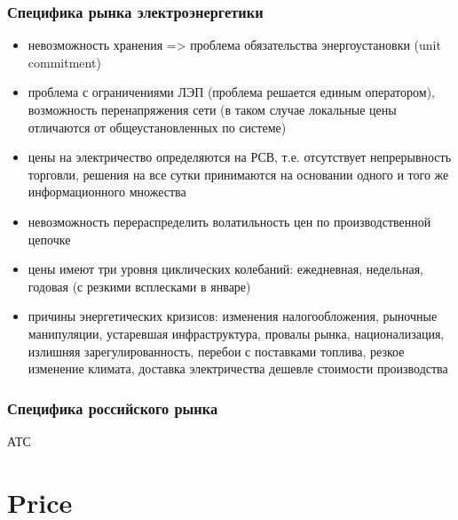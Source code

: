 \documentclass[c, dvipsnames]{beamer}  %
\begin{document}
\begin{frame}[shrink=5]
\frametitle{Специфика рынка электроэнергетики} 

\begin{itemize}
	\item невозможность хранения => проблема обязательства энергоустановки (unit commitment)
	\item проблема с ограничениями ЛЭП (проблема решается единым оператором), возможность перенапряжения сети (в таком случае локальные цены отличаются от общеустановленных по системе) 
	\item цены на электричество определяются на РСВ, т.е. отсутствует непрерывность торговли, решения на все сутки принимаются на основании одного и того же информационного множества
	\item невозможность перераспределить волатильность цен по производственной цепочке 
	\item  цены имеют три уровня циклических колебаний: ежедневная, недельная, годовая (с резкими всплесками в январе)
	\item причины энергетических кризисов: изменения налогообложения, рыночные манипуляции, устаревшая инфраструктура, провалы рынка, национализация, излишняя зарегулированность, перебои с поставками топлива, резкое изменение климата,  доставка электричества дешевле стоимости производства 
	  
\end{itemize}


\end{frame}


\begin{frame}[shrink=5]
\frametitle{Специфика российского рынка} 


АТС


\end{frame}



\section{Price}
\end{document}
